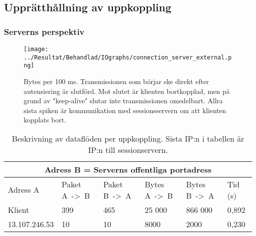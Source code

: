 \documentclass[journal,comsoc]{IEEEtran}
\begin{document}
\subsection{Upprätthållning av uppkoppling}
\subsubsection{Serverns perspektiv}
\begin{figure} [H]
  \centering
  \texttt{[image: ../Resultat/Behandlad/IOgraphs/connection\_server\_external.png]}
  \caption{Bytes per 100 ms. Transmissionen som börjar ske direkt efter autensiering är slutförd. Mot slutet är klienten bortkopplad, men på grund av "keep-alive" slutar inte transmissionen omedelbart. Allra sista spiken är kommunikation med sessionsservern om att klienten kopplats bort.}
  \label{fig:server:conn}
\end{figure}
\begin{table} [H]
  \begin{center}
    \label{table:server:conn}
    \begin{tabular}{ | m{1.5cm} |  m{1cm} | m{1cm}| m{1cm}|m{1cm}|m{0.5cm}| } 
      \hline
      \multicolumn{6}{|c|}{Adress B = Serverns offentliga portadress} \\
      \hline
      Adress A & Paket A~->~B & Paket B~->~A & Bytes A~->~B & Bytes B~->~A & Tid (s) \\
      \hline
      Klient & 399 & 465 & 25 000 & 866 000 & 0,892 \\
      \hline
      13.107.246.53 & 10 & 10 & 8000 & 2000 & 0,230 \\
      \hline 
    \end{tabular}
  \end{center}
  \caption{Beskrivning av dataflöden per uppkoppling. Sista IP:n i tabellen är IP:n till sessionservern.}
\end{table}
\end{document}
